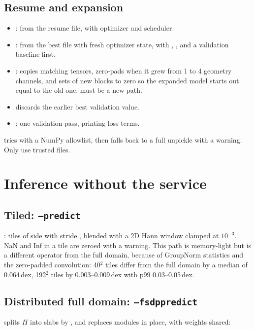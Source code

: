 \subsection{Resume and expansion}
\begin{itemize}
\item {}: from the resume file, with optimizer and scheduler.
\item {}: from the best file with fresh optimizer state, with , , and a validation baseline first.
\item {}:  copies matching tensors, zero-pads  when it grew from 1 to 4 geometry channels, and sets  of new blocks to zero so the expanded model starts out equal to the old one.  must be a new path.
\item {} discards the earlier best validation value.
\item {}: one validation pass, printing loss terms.
\end{itemize}

 tries  with a NumPy allowlist, then falls back to a full unpickle with a warning. Only use trusted files.

\section{Inference without the service}

\subsection{Tiled: \texttt{--predict}}
: tiles of side  with stride , blended with a 2D Hann window clamped at $10^{-3}$. NaN and Inf in a tile are zeroed with a warning. This path is memory-light but is a different operator from the full domain, because of GroupNorm statistics and the zero-padded convolution: 40$^2$ tiles differ from the full domain by a median of 0.064\,dex, 192$^2$ tiles by 0.003--0.009\,dex with p99 0.03--0.05\,dex.

\subsection{Distributed full domain: \texttt{--fsdppredict}}
 splits $H$ into slabs by , and  replaces modules in place, with weights shared:

